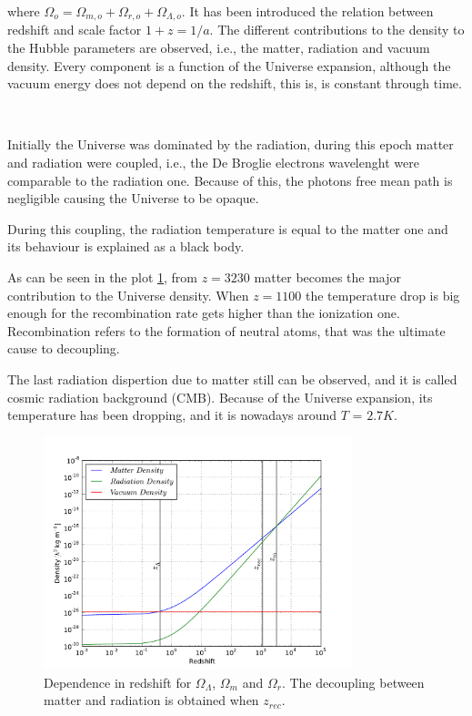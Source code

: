where $\Omega_o=\Omega_{m,o} +\Omega_{r,o}+\Omega_{\Lambda,o}$. 
It has been introduced the relation between redshift and scale
factor $1+z=1/a$. The different contributions to the density 
to the Hubble parameters are observed, i.e., the matter, radiation
and vacuum density. Every component is a function of the 
Universe expansion, although the vacuum energy does not depend
on the redshift, this is, is constant through time. 

\

Initially the Universe was dominated by the radiation, during 
this epoch matter and radiation were coupled, i.e., the De Broglie 
electrons wavelenght were comparable to the radiation one. Because
of this, the photons free mean path is negligible causing the Universe
to be opaque. 

During this coupling, the radiation temperature is equal to the 
matter one and its behaviour is explained as a black body. 

As can be seen in the plot \ref{densidad}, from $z=3230$
matter becomes the major contribution to the Universe density.
When $z=1100$ the temperature drop is big enough for the
recombination rate gets higher than the ionization one. 
Recombination refers to the formation of neutral atoms,
that was the ultimate cause to decoupling. 

The last radiation dispertion due to matter still can be
observed, and it is called cosmic radiation background (CMB).
Because of the Universe expansion, its temperature
has been dropping, and it is nowadays around $T$ = $2.7K$. 
  
\begin{figure}[htbp]
       \centering
               \includegraphics[width=0.8\textwidth]{Images/chapter2/density.pdf}
       \caption{ \small Dependence in redshift for $\Omega_\Lambda$, $\Omega_m$ and
       $\Omega_r$. The decoupling between matter and radiation is obtained when 
       $z_{rec}$.
        }
       \label{densidad}
 \end{figure}

